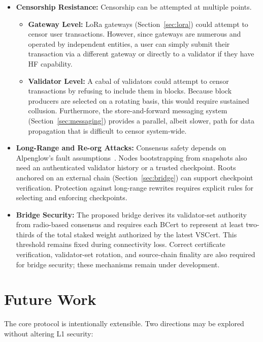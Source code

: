 \documentclass{article}
\begin{document}
\begin{itemize}
    \item \textbf{Censorship Resistance:} Censorship can be attempted at multiple points.
        \begin{itemize}
            \item \textbf{Gateway Level:} LoRa gateways (Section~\ref{sec:lora}) could attempt to censor user transactions. However, since gateways are numerous and operated by independent entities, a user can simply submit their transaction via a different gateway or directly to a validator if they have HF capability.
            \item \textbf{Validator Level:} A cabal of validators could attempt to censor transactions by refusing to include them in blocks. Because block producers are selected on a rotating basis, this would require sustained collusion. Furthermore, the store-and-forward messaging system (Section~\ref{sec:messaging}) provides a parallel, albeit slower, path for data propagation that is difficult to censor system-wide.
        \end{itemize}

    \item \textbf{Long-Range and Re-org Attacks:} Consensus safety depends on Alpenglow's fault assumptions~\cite{alpenglow}. Nodes bootstrapping from snapshots also need an authenticated validator history or a trusted checkpoint. Roots anchored on an external chain (Section~\ref{sec:bridge}) can support checkpoint verification. Protection against long-range rewrites requires explicit rules for selecting and enforcing checkpoints.

    \item \textbf{Bridge Security:} The proposed bridge derives its validator-set authority from radio-based consensus and requires each BCert to represent at least two-thirds of the total staked weight authorized by the latest VSCert. This threshold remains fixed during connectivity loss. Correct certificate verification, validator-set rotation, and source-chain finality are also required for bridge security; these mechanisms remain under development.
\end{itemize}

\section{Future Work}
\label{sec:future}

The core protocol is intentionally extensible. Two directions may be explored without altering L1 security:
\end{document}
